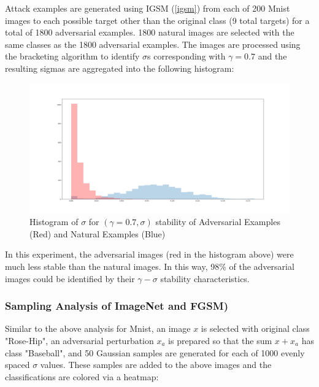 \documentclass[10pt]{extarticle}
\newcounter{col}
\begin{document}
Attack examples are generated using IGSM (\ref{igsm}) from each of 200 Mnist images to each possible target other than the original class (9 total targets) for a total of 1800 adversarial examples. 1800 natural images are selected with the same classes as the 1800 adversarial examples. The images are processed using the bracketing algorithm to identify $\sigma$s corresponding with $\gamma = 0.7$ and the resulting sigmas are aggregated into the following histogram:
\begin{figure}[H]
\includegraphics[trim=200 80 100 100, clip,width=12cm]{2019-04-10-adverse/original_hist.png}
\caption{Histogram of $\sigma$ for $(\gamma=0.7, \sigma)$ stability of Adversarial Examples (Red) and Natural Examples (Blue)}
\label{fgsmh}
\end{figure}


In this experiment, the adversarial images (red in the histogram above) were much less stable than the natural images. In this way, 98\% of the adversarial images could be identified by their $\gamma-\sigma$ stability characteristics. 


\subsubsection{Sampling Analysis of ImageNet and FGSM)}
Similar to the above analysis for Mnist, an image $x$ is selected with original class "Rose-Hip", an adversarial perturbation $x_a$ is prepared so that the sum $x + x_a$ has class "Baseball", and 50 Gaussian samples are generated for each of 1000 evenly spaced $\sigma$ values. These samples are added to the above images and the classifications are colored via a heatmap:
\end{document}
